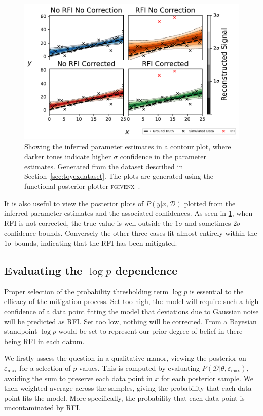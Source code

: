 \documentclass[fleqn,usenatbib]{mnras}
\begin{document}
\begin{figure}
	\includegraphics[width=\textwidth]{f_4pane_toy_sidebar.pdf}  
    \caption{Showing the inferred parameter estimates in a contour plot, where darker tones indicate higher $\sigma$ confidence in the parameter estimates. Generated from the dataset described in Section~\ref{sec:toyexdataset}. The plots are generated using the functional posterior plotter \textsc{fgivenx}~\protect\cite{fgivenx}.}
    \label{fig:fgx}
\end{figure}


It is also useful to view the posterior plots of $P(y|x, \mathcal{D})$ plotted from the inferred parameter estimates and the associated confidences. As seen in \cref{fig:fgx}, when RFI is not corrected, the true value is well outside the $1\sigma$ and sometimes $2\sigma$ confidence bounds. Conversely the other three cases fit almost entirely within the $1\sigma$ bounds, indicating that the RFI has been mitigated.

\subsection{Evaluating the $\log p$ dependence}\label{sec:logpdependence}
Proper selection of the probability thresholding term $\log p$ is essential to the efficacy of the mitigation process. Set too high, the model will require such a high confidence of a data point fitting the model that deviations due to Gaussian noise will be predicted as RFI. Set too low, nothing will be corrected. From a Bayesian standpoint $\log p$ would be set to represent our prior degree of belief in there being RFI in each datum.

We firstly assess the question in a qualitative manor, viewing the posterior on $\varepsilon_{\mathrm{max}}$ for a selection of $p $ values. This is computed by evaluating $P(\mathcal{D}|\theta, \varepsilon_{\mathrm{max}})$, avoiding the sum to preserve each data point in $x$ for each posterior sample. We then weighted average across the samples, giving the probability that each data point fits the model. More specifically, the probability that each data point is uncontaminated by RFI. 
\end{document}
